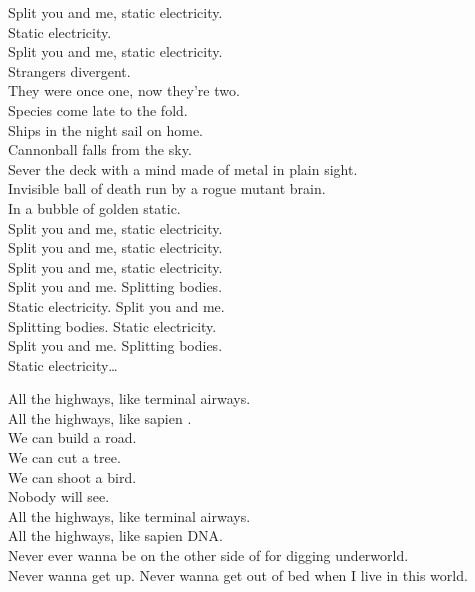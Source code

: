 Split you and me, static electricity. \\
Static electricity. \\
Split you and me, static electricity. \\

Strangers divergent. \\
They were once one, now they're two. \\
Species come late to the fold. \\
Ships in the night sail on home. \\
Cannonball falls from the sky. \\
Sever the deck with a mind made of metal in plain sight. \\
Invisible ball of death run by a rogue mutant brain. \\
In a bubble of golden static. \\

Split you and me, static electricity. \\
Split you and me, static electricity. \\
Split you and me, static electricity. \\

Split you and me. Splitting bodies. \\
Static electricity. Split you and me. \\
Splitting bodies. Static electricity. \\
Split you and me. Splitting bodies. \\
Static electricity… \\




All the highways, like terminal airways. \\
All the highways, like sapien . \\

We can build a road. \\
We can cut a tree. \\
We can shoot a bird. \\
Nobody will see. \\

All the highways, like terminal airways. \\
All the highways, like sapien DNA. \\

Never ever wanna be on the other side of  for digging underworld. \\
Never wanna get up. Never wanna get out of bed when I live in this world. \\

